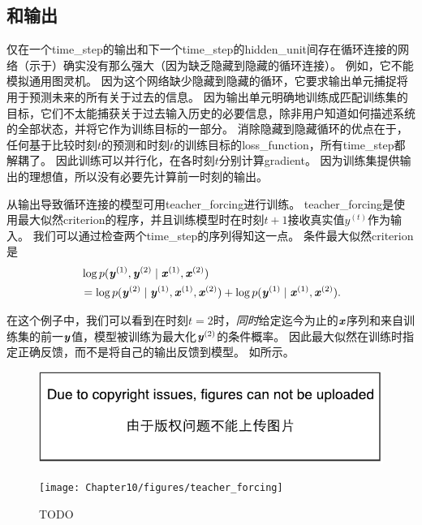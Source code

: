 
\subsection{和输出}
\label{sec:teacher_forcing_and_networks_with_output_recurrence}
仅在一个\gls{time_step}的输出和下一个\gls{time_step}的\gls{hidden_unit}间存在循环连接的网络（示于）确实没有那么强大（因为缺乏隐藏到隐藏的循环连接）。
例如，它不能模拟通用图灵机。
因为这个网络缺少隐藏到隐藏的循环，它要求输出单元捕捉将用于预测未来的所有关于过去的信息。
因为输出单元明确地训练成匹配训练集的目标，它们不太能捕获关于过去输入历史的必要信息，除非用户知道如何描述系统的全部状态，并将它作为训练目标的一部分。
消除隐藏到隐藏循环的优点在于，任何基于比较时刻$t$的预测和时刻$t$的训练目标的\gls{loss_function}，所有\gls{time_step}都解耦了。
因此训练可以并行化，在各时刻$t$分别计算\gls{gradient}。
因为训练集提供输出的理想值，所以没有必要先计算前一时刻的输出。

从输出导致循环连接的模型可用\gls{teacher_forcing}进行训练。
\gls{teacher_forcing}是使用最大似然\gls{criterion}的程序，并且训练模型时在时刻$t+1$接收真实值$y^{(t)}$作为输入。
我们可以通过检查两个\gls{time_step}的序列得知这一点。
条件最大似然\gls{criterion}是
\begin{align}
 &\log p(\boldsymbol{\mathit{y}}^{(1)},\boldsymbol{\mathit{y}}^{(2)} \mid \boldsymbol{\mathit{x}}^{(1)}, \boldsymbol{\mathit{x}}^{(2)} ) \\
 &= \log  p(\boldsymbol{\mathit{y}}^{(2)} \mid \boldsymbol{\mathit{y}}^{(1)}, \boldsymbol{\mathit{x}}^{(1)}, \boldsymbol{\mathit{x}}^{(2)} )  + \log p(\boldsymbol{\mathit{y}}^{(1)} \mid \boldsymbol{\mathit{x}}^{(1)}, \boldsymbol{\mathit{x}}^{(2)}) .
\end{align}


在这个例子中，我们可以看到在时刻$t=2$时，\emph{同时}给定迄今为止的$\boldsymbol{\mathit{x}}$序列和来自训练集的前一$\boldsymbol{\mathit{y}}$值，模型被训练为最大化$\boldsymbol{\mathit{y}}^{(2)}$的条件概率。
因此最大似然在训练时指定正确反馈，而不是将自己的输出反馈到模型。
如所示。
\begin{figure}[!htb]
\ifOpenSource
\centerline{\includegraphics{figure.pdf}}
\else
\centerline{\texttt{[image: Chapter10/figures/teacher\_forcing]}}
\fi
\caption{TODO}
\label{fig:chap10_teacher_forcing}
\end{figure}

